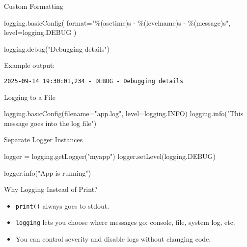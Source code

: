 \documentclass[
  letterpaper,
  DIV=11,
  numbers=noendperiod]{scrreprt}
\newenvironment{Shaded}{\begin{snugshade}}{\end{snugshade}}
\newcommand{\BuiltInTok}[1]{\textcolor[rgb]{0.00,0.23,0.31}{#1}}
\newcommand{\NormalTok}[1]{\textcolor[rgb]{0.00,0.23,0.31}{#1}}
\newcommand{\OperatorTok}[1]{\textcolor[rgb]{0.37,0.37,0.37}{#1}}
\newcommand{\SpecialCharTok}[1]{\textcolor[rgb]{0.37,0.37,0.37}{#1}}
\newcommand{\StringTok}[1]{\textcolor[rgb]{0.13,0.47,0.30}{#1}}
\providecommand{\tightlist}{%
  \setlength{\itemsep}{0pt}\setlength{\parskip}{0pt}}
\begin{document}
Custom Formatting

\begin{Shaded}
\begin{Highlighting}[]
\NormalTok{logging.basicConfig(}
    \BuiltInTok{format}\OperatorTok{=}\StringTok{"}\SpecialCharTok{\%(asctime)s}\StringTok{ {-} }\SpecialCharTok{\%(levelname)s}\StringTok{ {-} }\SpecialCharTok{\%(message)s}\StringTok{"}\NormalTok{,}
\NormalTok{    level}\OperatorTok{=}\NormalTok{logging.DEBUG}
\NormalTok{)}

\NormalTok{logging.debug(}\StringTok{"Debugging details"}\NormalTok{)}
\end{Highlighting}
\end{Shaded}

Example output:

\begin{verbatim}
2025-09-14 19:30:01,234 - DEBUG - Debugging details
\end{verbatim}

Logging to a File

\begin{Shaded}
\begin{Highlighting}[]
\NormalTok{logging.basicConfig(filename}\OperatorTok{=}\StringTok{"app.log"}\NormalTok{, level}\OperatorTok{=}\NormalTok{logging.INFO)}
\NormalTok{logging.info(}\StringTok{"This message goes into the log file"}\NormalTok{)}
\end{Highlighting}
\end{Shaded}

Separate Logger Instances

\begin{Shaded}
\begin{Highlighting}[]
\NormalTok{logger }\OperatorTok{=}\NormalTok{ logging.getLogger(}\StringTok{"myapp"}\NormalTok{)}
\NormalTok{logger.setLevel(logging.DEBUG)}

\NormalTok{logger.info(}\StringTok{"App is running"}\NormalTok{)}
\end{Highlighting}
\end{Shaded}

Why Logging Instead of Print?

\begin{itemize}
\tightlist
\item
  \texttt{print()} always goes to stdout.
\item
  \texttt{logging} lets you choose where messages go: console, file,
  system log, etc.
\item
  You can control severity and disable logs without changing code.
\end{itemize}
\end{document}
